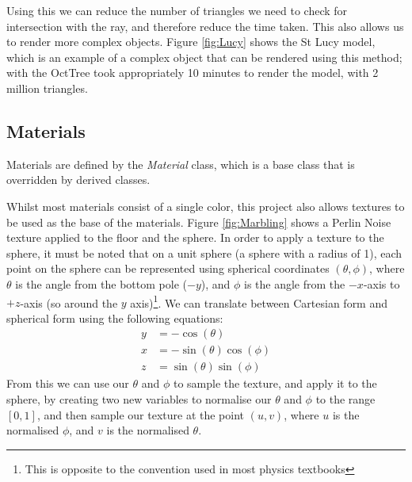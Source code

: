 \documentclass[../main.tex]{subfiles}
\begin{document}
Using this we can reduce the number of triangles we need to check for intersection with the ray, and therefore reduce the time 
taken. This also allows us to render more complex objects. Figure \ref{fig:Lucy} shows the St Lucy model, which is
an example of a complex object that can be rendered using this method; with the OctTree took appropriately 10 minutes
to render the model, with 2 million triangles.

\subsection{Materials}
Materials are defined by the \textit{Material} class, which is a base class that is overridden by derived classes.

Whilst most materials consist of a single color, this project also allows textures to be used as the base of the 
materials. Figure \ref{fig:Marbling} shows a Perlin Noise texture applied to the floor and the sphere. In order 
to apply a texture to the sphere, it must be noted that on a unit sphere (a sphere with a radius of 1), each
point on the sphere can be represented using spherical coordinates $(\theta, \phi)$, where $\theta$ is the angle
from the bottom pole ($-y$), and $\phi$ is the angle from the $-x$-axis to $+z$-axis (so around the $y$ axis)\footnote{This is opposite to the convention used 
in most physics textbooks}.
We can translate between Cartesian form and spherical form using the following equations:
\begin{align*}
  y &= -\cos(\theta) \\
  x &= -\sin(\theta) \cos(\phi) \\
  z &= \sin(\theta) \sin(\phi)
\end{align*}
From this we can use our $\theta$ and $\phi$ to sample the texture, and apply it to the sphere, by 
creating two new variables to normalise our $\theta$ and $\phi$ to the range $[0, 1]$, and then 
sample our texture at the point $(u, v)$, where $u$ is the normalised $\phi$, and $v$ is the normalised $\theta$.
\end{document}
